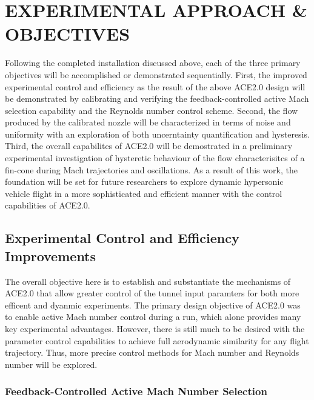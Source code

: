 %
%  
%


\chapter{EXPERIMENTAL APPROACH \& OBJECTIVES}

Following the completed installation discussed above, each of the three primary objectives will be accomplished or demonstrated sequentially. First, the improved experimental control and efficiency as the result of the above ACE2.0 design will be demonstrated by calibrating and verifying the feedback-controlled active Mach selection capability and the Reynolds number control scheme. Second, the flow produced by the calibrated nozzle will be characterized in terms of noise and uniformity with an exploration of both uncerntainty quantification and hysteresis. Third, the overall capabilites of ACE2.0 will be demostrated in a preliminary experimental investigation of hysteretic behaviour of the flow characterisitcs of a fin-cone during Mach trajectories and oscillations. As a result of this work, the foundation will be set for future researchers to explore dynamic hypersonic vehicle flight in a more sophisticated and efficient manner with the control capabilities of ACE2.0.


\section{Experimental Control and Efficiency Improvements} 

The overall objective here is to establish and substantiate the mechanisms of ACE2.0 that allow greater control of the tunnel input paramters for both more efficent and dyanmic experiments. The primary design objective of ACE2.0 was to enable active Mach number control during a run, which alone provides many key experimental advantages. However, there is still much to be desired with the parameter control capabilities to achieve full aerodynamic similarity for any flight trajectory. Thus, more precise control methods for Mach number and Reynolds number will be explored.

\subsection{Feedback-Controlled Active Mach Number Selection}

